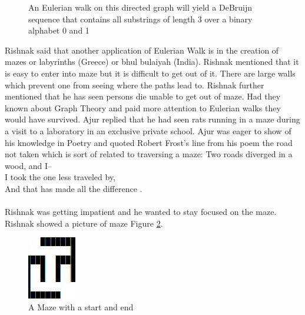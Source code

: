 \begin{figure}
\begin{center}
\caption{ An Eulerian walk on this directed graph will yield a DeBruijn sequence that contains all substrings of length 3 over a binary alphabet 0 and 1}\label{4g6}
\end{center}
\end{figure}
\noindent
Rishnak said that another application of Eulerian Walk is in the creation of mazes or labyrinths (Greece) or bhul bulaiyah (India).  Rishnak mentioned that it is easy to enter into maze but it is difficult to get out of it. There are large walls which prevent one from seeing where the paths lead to. Rishnak further mentioned that he has seen persons die unable to get out of maze. Had they known about Graph Theory and paid more attention to Eulerian walks they would have survived. Ajur replied that he had seen rats running in a maze during a visit to a laboratory in an exclusive private school. Ajur was eager to show of his knowledge in Poetry and quoted Robert Frost's line from his poem the road not taken which is sort of related to traversing a maze: {\quote Two roads diverged in a wood, and I--\\ 
I took the one less traveled by,\\ And that has made all the difference} . 
\\
\\
\noindent Rishnak was getting impatient and he wanted to stay focused on the maze. Rishnak showed a picture of maze Figure \ref{4g7}.
\begin{figure}
\begin{center}
\includegraphics{maze1.JPG}
\caption{A Maze with a start and end}\label{4g7}
\end{center}
\end{figure}

